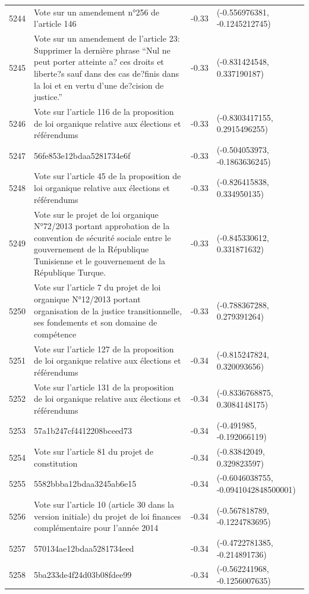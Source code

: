 \begin{table}[ht]
\begin{tabular}{rlrl}
  5244 & Vote sur un amendement n°256 de l'article 146 & -0.33 & (-0.556976381, -0.1245212745) \\ 
  5245 & Vote sur un amendement de l'article 23: Supprimer la dernière phrase “Nul ne peut porter atteinte a? ces droits et liberte?s sauf dans des cas de?finis dans la loi et en vertu d’une de?cision de justice.” & -0.33 & (-0.831424548, 0.337190187) \\ 
  5246 & Vote sur l'article 116 de la proposition de loi organique relative aux élections et référendums & -0.33 & (-0.8303417155, 0.2915496255) \\ 
  5247 & 56fe853e12bdaa5281734e6f & -0.33 & (-0.504053973, -0.1863636245) \\ 
  5248 & Vote sur l'article 45 de la proposition de loi organique relative aux élections et référendums & -0.33 & (-0.826415838, 0.334950135) \\ 
  5249 & Vote sur le projet de loi organique N°72/2013 portant approbation de la convention de sécurité sociale entre le gouvernement de la République Tunisienne et le gouvernement de la République Turque. & -0.33 & (-0.845330612, 0.331871632) \\ 
  5250 & Vote sur l'article 7 du projet de loi organique N°12/2013 portant organisation de la justice transitionnelle, ses fondements et son domaine de compétence & -0.33 & (-0.788367288, 0.279391264) \\ 
  5251 & Vote sur l'article 127 de la proposition de loi organique relative aux élections et référendums & -0.34 & (-0.815247824, 0.320093656) \\ 
  5252 & Vote sur l'article 131 de la proposition de loi organique relative aux élections et référendums & -0.34 & (-0.8336768875, 0.3084148175) \\ 
  5253 & 57a1b247cf4412208bceed73 & -0.34 & (-0.491985, -0.192066119) \\ 
  5254 & Vote sur l'article 81 du projet de constitution & -0.34 & (-0.83842049, 0.329823597) \\ 
  5255 & 5582bbba12bdaa3245ab6e15 & -0.34 & (-0.6046038755, -0.0941042848500001) \\ 
  5256 & Vote sur l'article 10 (article 30 dans la version initiale) du projet de loi finances complémentaire pour l'année 2014 & -0.34 & (-0.567818789, -0.1224783695) \\ 
  5257 & 570134ae12bdaa5281734eed & -0.34 & (-0.4722781385, -0.214891736) \\ 
  5258 & 5ba233de4f24d03b08fdee99 & -0.34 & (-0.562241968, -0.1256007635) \\ 

\end{tabular}
\end{table}
